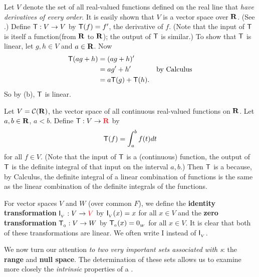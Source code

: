 \begin{example} \label{example 2.1.6}
Let \(V\) denote the set of all real-valued functions defined on the real line that \emph{have derivatives of every order}.
It is easily shown that \(V\) is a vector space over \(\mathbf{R}\).
(See .)
Define \(\textsf{T} : V \to V\) by \(\textsf{T}(f) = f'\), the derivative of \(f\).
(Note that the input of \(\textsf{T}\) is itself a function(from \(\mathbf{R}\) to \(\mathbf{R}\)); the output of \(\textsf{T}\) is similar.)
To show that \(\textsf{T}\) is linear, let \(g, h \in V\) and \(a \in \mathbf{R}\).
Now
\begin{align*}
    \textsf{T}(ag + h) & = (ag + h)' \\
              & = ag' + h' & \text{by Calculus} \\
              & = a\textsf{T}(g) + \textsf{T}(h).
\end{align*}
So by (b), \(\textsf{T}\) is linear.
\end{example}

\begin{example} \label{example 2.1.7}
Let \(V = \mathcal{C}(\mathbf{R})\), the vector space of all continuous real-valued functions on \(\mathbf{R}\).
Let \(a, b \in \mathbf{R}\), \(a < b\).
Define \(\T : V \to \RED{\SET{R}}\) by
\[
    \textsf{T}(f) = \int_a^b f(t) dt
\]
for all \(f \in V\).
(Note that the input of \(\textsf{T}\) is a (continuous) function, the output of \(\textsf{T}\) is the definite integral of that input on the interval \(a, b\).)
Then \(\textsf{T}\) is a \LTRAN{} because, by Calculus, the definite integral of a linear combination of functions is the same as the linear combination of
the definite integrals of the functions.
\end{example}

\begin{additional definition} \label{adef 2.1}
For vector spaces \(V\) and \(W\) (over common \(F\)), we define the \textbf{identity transformation} \(\ITRANV: V \to \RED{V}\) by \(\textsf{I}_{_V}(x) = x\) for all \(x \in V\) and the \textbf{zero transformation} \(\textsf{T}_{_0}: V \to W\) by \(\textsf{T}_{_0}(x) = 0_{_W}\) for all \(x \in V\).
It is clear that both of these transformations are linear.
We often write \(\mathrm{I}\) instead of \(\textsf{I}_{_V}\).
\end{additional definition}

We now turn our attention \emph{to two very important sets associated with \LTRAN{}s}: the \textbf{range} and \textbf{null space}.
The determination of these sets allows us to examine more closely the \emph{intrinsic} properties of a \LTRAN{}.

